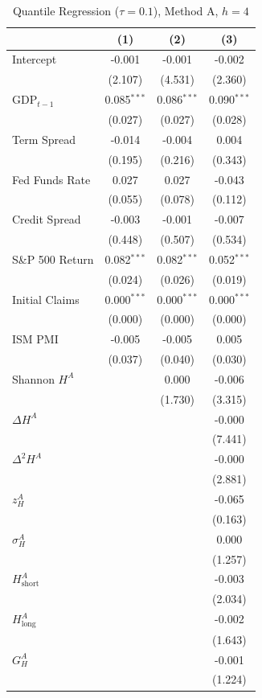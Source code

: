 \begin{table}[htbp]
\centering
\caption{Quantile Regression ($\tau = 0.1$), Method A, $h = 4$}
\label{tab:qr_coef_A_h4}
\footnotesize
\begin{tabular}{lccc}
\toprule
 & (1) & (2) & (3) \\
\midrule
  Intercept & -0.001 & -0.001 & -0.002 \\
  & (2.107) & (4.531) & (2.360) \\[2pt]
  GDP$_{t-1}$ & 0.085$^{***}$ & 0.086$^{***}$ & 0.090$^{***}$ \\
  & (0.027) & (0.027) & (0.028) \\[2pt]
  Term Spread & -0.014 & -0.004 & 0.004 \\
  & (0.195) & (0.216) & (0.343) \\[2pt]
  Fed Funds Rate & 0.027 & 0.027 & -0.043 \\
  & (0.055) & (0.078) & (0.112) \\[2pt]
  Credit Spread & -0.003 & -0.001 & -0.007 \\
  & (0.448) & (0.507) & (0.534) \\[2pt]
  S\&P 500 Return & 0.082$^{***}$ & 0.082$^{***}$ & 0.052$^{***}$ \\
  & (0.024) & (0.026) & (0.019) \\[2pt]
  Initial Claims & 0.000$^{***}$ & 0.000$^{***}$ & 0.000$^{***}$ \\
  & (0.000) & (0.000) & (0.000) \\[2pt]
  ISM PMI & -0.005 & -0.005 & 0.005 \\
  & (0.037) & (0.040) & (0.030) \\[2pt]
  Shannon $H^A$ &  & 0.000 & -0.006 \\
  &  & (1.730) & (3.315) \\[2pt]
  $\Delta H^A$ &  &  & -0.000 \\
  &  &  & (7.441) \\[2pt]
  $\Delta^2 H^A$ &  &  & -0.000 \\
  &  &  & (2.881) \\[2pt]
  $z^A_H$ &  &  & -0.065 \\
  &  &  & (0.163) \\[2pt]
  $\sigma^A_H$ &  &  & 0.000 \\
  &  &  & (1.257) \\[2pt]
  $H^A_{\mathrm{short}}$ &  &  & -0.003 \\
  &  &  & (2.034) \\[2pt]
  $H^A_{\mathrm{long}}$ &  &  & -0.002 \\
  &  &  & (1.643) \\[2pt]
  $G^A_H$ &  &  & -0.001 \\
  &  &  & (1.224) \\[2pt]
\bottomrule
\end{tabular}
\end{table}
